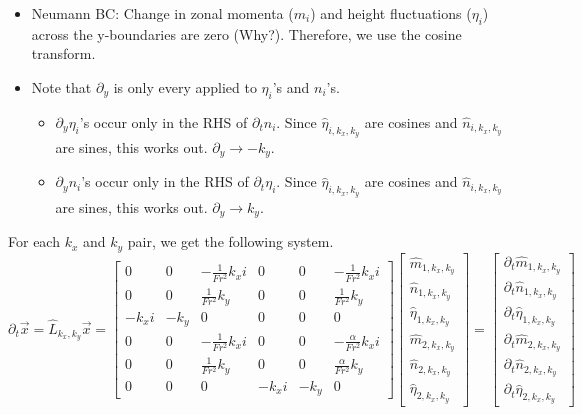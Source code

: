 \documentclass[10pt]{article}
\newcommand{\pd}[1]{\partial_{#1}}
\begin{document}
\begin{itemize}
\begin{itemize}
		\item Neumann BC: Change in zonal momenta ($m_i$) and height fluctuations ($\eta_i$) across the y-boundaries are zero {\color{blue}(Why?)}. Therefore, we use the cosine transform. 
		\item Note that $\pd{y}$ is only every applied to $\eta_i$'s and $n_i$'s. 
		\begin{itemize}
			\item $\pd{y}\eta_i$'s occur only in the RHS of $\pd{t}n_i$. Since $\hat{\eta}_{i, k_x, k_y}$ are cosines and $\hat{n}_{i, k_x, k_y}$ are sines, this works out. $\pd{y}\rightarrow -k_y$.
			\item $\pd{y}n_i$'s occur only in the RHS of $\pd{t}\eta_i$. Since $\hat{\eta}_{i, k_x, k_y}$ are cosines and $\hat{n}_{i, k_x, k_y}$ are sines, this works out. $\pd{y}\rightarrow k_y$.
		\end{itemize}
	\end{itemize}
\end{itemize}
For each $k_x$ and $k_y$ pair, we get the following system.
\[\pd{t}\vec{x} = \hat{L}_{k_x,k_y}\vec{x}=
\left[\begin{array}{ccc|ccc}
0 & 0 & -\frac{1}{Fr^2}k_xi & 0 & 0 & -\frac{1}{Fr^2}k_xi \\
0 & 0 & \frac{1}{Fr^2}k_y & 0 & 0 & \frac{1}{Fr^2}k_y\\
-k_xi & -k_y & 0 & 0 & 0 & 0 \\ \hline
0 & 0 & -\frac{1}{Fr^2}k_xi & 0 & 0 &  -\frac{\alpha}{Fr^2}k_xi \\
0 & 0 & \frac{1}{Fr^2}k_y & 0  & 0&  \frac{\alpha}{Fr^2}k_y \\
0 & 0 & 0 & -k_xi & -k_y & 0
\end{array}\right] \begin{bmatrix}
\hat{m}_{1,k_x,k_y}\\
\hat{n}_{1,k_x,k_y}\\
\hat{\eta}_{1,k_x,k_y}\\
\hat{m}_{2,k_x,k_y}\\
\hat{n}_{2,k_x,k_y}\\
\hat{\eta}_{2,k_x,k_y}
\end{bmatrix} = \begin{bmatrix}
\pd{t}\hat{m}_{1,k_x,k_y}\\
\pd{t}\hat{n}_{1,k_x,k_y}\\
\pd{t}\hat{\eta}_{1,k_x,k_y}\\
\pd{t}\hat{m}_{2,k_x,k_y}\\
\pd{t}\hat{n}_{2,k_x,k_y}\\
\pd{t}\hat{\eta}_{2,k_x,k_y}
\end{bmatrix}
\]
\end{document}
